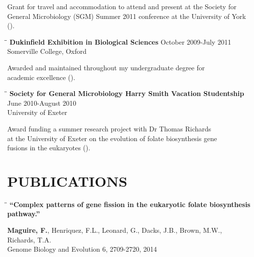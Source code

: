 \documentclass{res}
\begin{document}
\begin{resume}
\begin{tabbing}
   \end{tabbing}\vspace{-30pt}      
   Grant for travel and accommodation to attend and present at the Society for \\ General Microbiology (SGM) Summer 2011 conference at the University of York (). 

 
   \begin{tabbing}
   \hspace{2in}\= \hspace{2.6in}\= \kill 
    {\bf Dukinfield Exhibition in Biological Sciences} \> \>        October 2009-July 2011\\
                                               
                                               \> \> Somerville College, Oxford \\
   \end{tabbing}\vspace{-30pt}     
   Awarded and maintained throughout my undergraduate degree for \\academic excellence ().

\vspace{-0.1in}  
   \begin{tabbing}
   \hspace{2in}\= \hspace{2.6in}\= \kill 
    {\bf Society for General Microbiology Harry Smith Vacation Studentship} \> \>June 2010-August 2010\\
                            \> 
                            \> University of Exeter\\
   \end{tabbing}\vspace{-30pt}     
      Award funding a summer research project with Dr Thomas Richards \\
       at the University of Exeter on the evolution of folate biosynthesis gene \\
       fusions in the eukaryotes ().

\section{PUBLICATIONS} 
\vspace{-0.05in}
 \begin{tabbing}
   \hspace{2.3in}\= \hspace{2.6in}\= \kill
   {\bf ``Complex patterns of gene fission in the eukaryotic folate biosynthesis pathway.''\\
  }
   \end{tabbing}\vspace{-20pt}
   \textbf{Maguire, F.}, Henriquez, F.L., Leonard, G., Dacks, J.B., Brown, M.W.,  Richards, T.A.\\
   Genome Biology and Evolution 6, 2709-2720, 2014\\


\end{resume}
\end{document}
